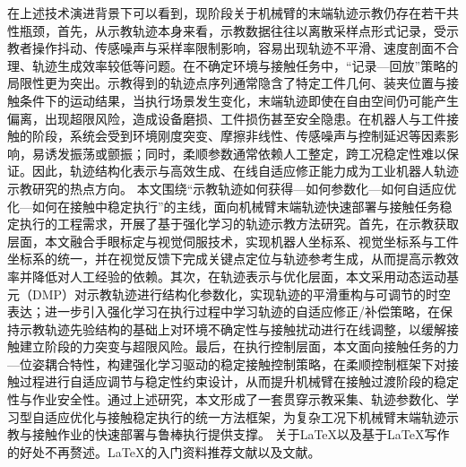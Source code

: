 在上述技术演进背景下可以看到，现阶段关于机械臂的末端轨迹示教仍存在若干共性瓶颈，首先，从示教轨迹本身来看，示教数据往往以离散采样点形式记录，受示教者操作抖动、传感噪声与采样率限制影响，容易出现轨迹不平滑、速度剖面不合理、轨迹生成效率较低等问题。在不确定环境与接触任务中，“记录—回放”策略的局限性更为突出。示教得到的轨迹点序列通常隐含了特定工件几何、装夹位置与接触条件下的运动结果，当执行场景发生变化，末端轨迹即使在自由空间仍可能产生偏离，出现超限风险，造成设备磨损、工件损伤甚至安全隐患。在机器人与工件接触的阶段，系统会受到环境刚度突变、摩擦非线性、传感噪声与控制延迟等因素影响，易诱发振荡或颤振；同时，柔顺参数通常依赖人工整定，跨工况稳定性难以保证。因此，轨迹结构化表示与高效生成、在线自适应修正能力成为工业机器人轨迹示教研究的热点方向。
本文围绕“示教轨迹如何获得—如何参数化—如何自适应优化—如何在接触中稳定执行”的主线，面向机械臂末端轨迹快速部署与接触任务稳定执行的工程需求，开展了基于强化学习的轨迹示教方法研究。首先，在示教获取层面，本文融合手眼标定与视觉伺服技术，实现机器人坐标系、视觉坐标系与工件坐标系的统一，并在视觉反馈下完成关键点定位与轨迹参考生成，从而提高示教效率并降低对人工经验的依赖。其次，在轨迹表示与优化层面，本文采用动态运动基元（DMP）对示教轨迹进行结构化参数化，实现轨迹的平滑重构与可调节的时空表达；进一步引入强化学习在执行过程中学习轨迹的自适应修正/补偿策略，在保持示教轨迹先验结构的基础上对环境不确定性与接触扰动进行在线调整，以缓解接触建立阶段的力突变与超限风险。最后，在执行控制层面，本文面向接触任务的力—位姿耦合特性，构建强化学习驱动的稳定接触控制策略，在柔顺控制框架下对接触过程进行自适应调节与稳定性约束设计，从而提升机械臂在接触过渡阶段的稳定性与作业安全性。通过上述研究，本文形成了一套贯穿示教采集、轨迹参数化、学习型自适应优化与接触稳定执行的统一方法框架，为复杂工况下机械臂末端轨迹示教与接触作业的快速部署与鲁棒执行提供支撑。
%
关于\LaTeX{}以及基于\LaTeX{}写作的好处不再赘述。\LaTeX{}的入门资料推荐文献\parencite{_g}以及文献\parencite{_c}。

